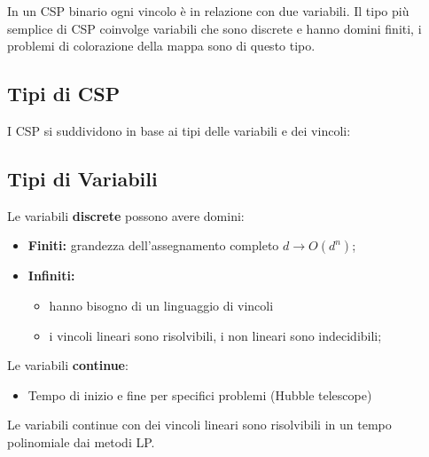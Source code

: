 \noindent In un CSP binario ogni vincolo è in relazione con due variabili. Il
tipo più semplice di CSP coinvolge variabili che sono discrete e hanno domini
finiti, i problemi di colorazione della mappa sono di questo tipo.

\subsection{Tipi di CSP}
I CSP si suddividono in base ai tipi delle variabili e dei vincoli:
\subsection{Tipi di Variabili}
Le variabili \textbf{discrete} possono avere domini:
\begin{itemize}
    \item \textbf{Finiti:} grandezza dell'assegnamento completo $d \rightarrow
              O(d^n)$;
    \item \textbf{Infiniti:}
          \begin{itemize}
              \item hanno bisogno di un linguaggio di vincoli
              \item i vincoli lineari sono risolvibili, i non lineari sono
                    indecidibili;
          \end{itemize}
\end{itemize}
Le variabili \textbf{continue}:
\begin{itemize}
    \item Tempo di inizio e fine per specifici problemi (Hubble telescope)
\end{itemize}
Le variabili continue con dei vincoli lineari sono risolvibili in un tempo
polinomiale dai metodi LP.

